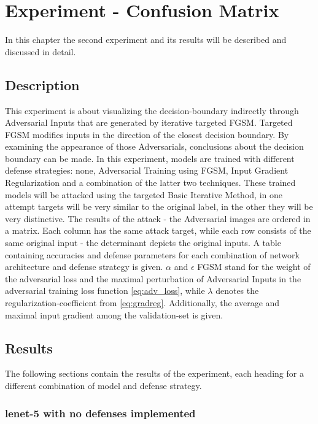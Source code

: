\documentclass[draft,final]{vutinfth} %
\begin{document}
\chapter{Experiment - Confusion Matrix}

In this chapter the second experiment and its results will be described and discussed in detail.

\section{Description}

This experiment is about visualizing the decision-boundary indirectly through Adversarial Inputs that are generated by iterative targeted FGSM.
Targeted FGSM modifies inputs in the direction of the closest decision boundary.
By examining the appearance of those Adversarials, conclusions about the decision boundary can be made.
In this experiment, models are trained with different defense strategies: none, Adversarial Training using FGSM, Input Gradient Regularization and a combination of the latter two techniques.
These trained models will be attacked using the targeted Basic Iterative Method, in one attempt targets will be very similar to the original label, in the other they will be very distinctive.
The results of the attack - the Adversarial images are ordered in a matrix.
Each column has the same attack target, while each row consists of the same original input - the determinant depicts the original inputs.
A table containing accuracies and defense parameters for each combination of network architecture and defense strategy is given.
$\alpha$ and $\epsilon$ FGSM stand for the weight of the adversarial loss and the maximal perturbation of Adversarial Inputs in the adversarial training loss function \ref{eq:adv_loss}, while $\lambda$ denotes the regularization-coefficient from \ref{eq:gradreg}.
Additionally, the average and maximal input gradient among the validation-set is given.


\section{Results}

The following sections contain the results of the experiment, each heading for a different combination of model and defense strategy.

\clearpage

\subsection{lenet-5 with no defenses implemented}
\end{document}
